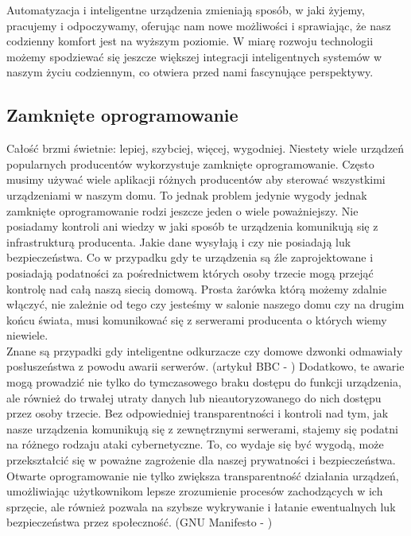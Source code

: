 Automatyzacja i inteligentne urządzenia zmieniają sposób, w jaki żyjemy, pracujemy i odpoczywamy, oferując nam nowe możliwości i sprawiając, że nasz codzienny komfort jest na wyższym poziomie. W miarę rozwoju technologii możemy spodziewać się jeszcze większej integracji inteligentnych systemów w naszym życiu codziennym, co otwiera przed nami fascynujące perspektywy.

\newpage

\subsection{Zamknięte oprogramowanie}
Całość brzmi świetnie: lepiej, szybciej, więcej, wygodniej. Niestety wiele urządzeń popularnych producentów wykorzystuje zamknięte oprogramowanie. Często musimy używać wiele aplikacji różnych producentów aby sterować wszystkimi urządzeniami w naszym domu. To jednak problem jedynie wygody jednak zamknięte oprogramowanie rodzi jeszcze jeden o wiele poważniejszy. Nie posiadamy kontroli ani wiedzy w jaki sposób te urządzenia komunikują się z infrastrukturą producenta. Jakie dane wysyłają i czy nie posiadają luk bezpieczeństwa. Co w przypadku gdy te urządzenia są źle zaprojektowane i posiadają podatności za pośrednictwem których osoby trzecie mogą przejąć kontrolę nad całą naszą siecią domową. Prosta żarówka którą możemy zdalnie włączyć, nie zależnie od tego czy jesteśmy w salonie naszego domu czy na drugim końcu świata, musi komunikować się z serwerami producenta o których wiemy niewiele.\\

Znane są przypadki gdy inteligentne odkurzacze czy domowe dzwonki odmawiały posłuszeństwa z powodu awarii serwerów. (artykuł BBC - \cite{amazonoutage}) Dodatkowo, te awarie mogą prowadzić nie tylko do tymczasowego braku dostępu do funkcji urządzenia, ale również do trwałej utraty danych lub nieautoryzowanego do nich dostępu przez osoby trzecie. Bez odpowiedniej transparentności i kontroli nad tym, jak nasze urządzenia komunikują się z zewnętrznymi serwerami, stajemy się podatni na różnego rodzaju ataki cybernetyczne. To, co wydaje się być wygodą, może przekształcić się w poważne zagrożenie dla naszej prywatności i bezpieczeństwa.\\

Otwarte oprogramowanie nie tylko zwiększa transparentność działania urządzeń, umożliwiając użytkownikom lepsze zrozumienie procesów zachodzących w ich sprzęcie, ale również pozwala na szybsze wykrywanie i łatanie ewentualnych luk bezpieczeństwa przez społeczność. (GNU Manifesto - \cite{gnumanifesto})\\

